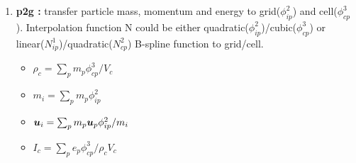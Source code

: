 \documentclass[11pt]{article}
\def\bbf#1{\mathchoice{\hbox{\boldmath$\displaystyle#1$}}
{\hbox{\boldmath$\textstyle#1$}} {\hbox{\boldmath$\scriptstyle#1$}} {\hbox{\boldmath$\scriptscriptstyle#1$}} }
\renewcommand{\mp}{m_{p}}
\newcommand{\pcp}{\phi_{cp}^3}
\newcommand{\pip}{\phi_{ip}^2}
\newcommand{\ui}{\bbf{u}_i}
\newcommand{\up}{\bbf{u}_p}
\newcommand{\ep}{e_p}
\newcommand{\mi}{m_i}
\renewcommand{\mp}{m_p}
\newcommand{\rhoc}{\rho_c}
\newcommand{\Vc}{V_c}
\newcommand{\ic}{I_c}
\newcommand{\dic}{\bbf{d}_{ic}}
\begin{document}
\begin{enumerate}
	
\item {\bf p2g :} transfer particle mass, momentum and energy to grid($\pip$) and cell($\pcp$). Interpolation function N could be either quadratic($\pip$)/cubic($\pcp$) or linear($N_{ip}^1$)/quadratic($N_{cp}^2$) B-spline function to grid/cell. 
\begin{itemize}
	\item $\rhoc = \sum_p \mp \pcp / \Vc$
	\item $\mi = \sum_p \mp \pip$
	\item $\ui = \sum_p \mp \up \pip / \mi$ 
	\item $\ic = \sum_p \ep \pcp / \rhoc \Vc$
\end{itemize}



\end{enumerate}
\end{document}
